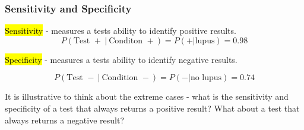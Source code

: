 
\begin{frame}
\frametitle{Sensitivity and Specificity}

\hl{Sensitivity} - measures a tests ability to identify positive results.
\[P(\text{Test }+~|~\text{Conditon }+) = P(+ | \text{lupus}) = 0.98\]

\hl{Specificity} - measures a tests ability to identify negative results.

\[P(\text{Test }-~|~\text{Condition }-) = P(- | \text{no lupus}) = 0.74\]

\pause
\vspace{1cm}

It is illustrative to think about the extreme cases - what is the sensitivity and specificity of a test that always returns a positive result? What about a test that always returns a negative result?

\end{frame}



